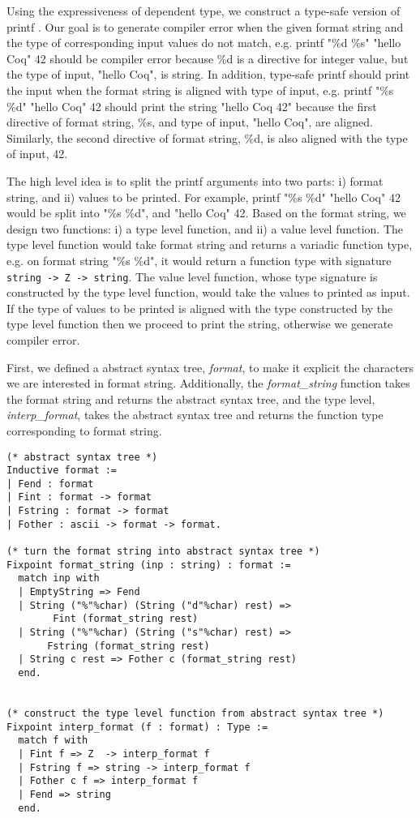  
 Using the expressiveness of dependent type, we construct a type-safe version of 
 printf \citep{Pierce:2004:ATT:107626}. Our goal is to generate compiler error when the given format string and the type of 
 corresponding input values  
 do not match, e.g. printf "\%d \%s" "hello Coq" 42 should be compiler error because
 \%d is a directive for integer value, but the type of input, "hello Coq", is string. In addition, 
 type-safe printf should print the input when the format string is aligned with type of input, e.g.
 printf "\%s \%d" "hello Coq" 42 should print the string "hello Coq  42" because the first directive 
 of format string, \%s, and type of input, "hello Coq", are aligned. Similarly, the second directive 
 of format string, \%d, is also aligned with the type of input, 42.
 
 The high level idea is to split the printf arguments into two parts: i) format string, 
 and ii) values to be printed. For example, printf "\%s \%d" "hello Coq" 42 would be split into "\%s \%d", and 
 "hello Coq" 42.  Based on the format string, we design two functions: i) a type level function, 
 and ii) a value level function. The type level function would 
 take format string and returns a variadic function type, e.g. 
 on format string "\%s \%d", it would return a function type with 
 signature \texttt{string -> Z  -> string}.
 The value level function, whose type signature 
 is constructed by the type level function, would take the values to printed as input. If the 
 type of values to be printed is aligned with the type constructed by the type level function then 
 we proceed to print the string, otherwise we generate compiler error.  
 


First, we defined a abstract syntax tree, \textit{format}, to make it explicit the characters we 
are interested in format string. Additionally, the \textit{format\_string} function takes the format string 
and returns the abstract syntax tree, and the type level, \textit{interp\_format}, takes the 
abstract syntax tree and returns the function type corresponding to format string.

\begin{verbatim}
(* abstract syntax tree *)
Inductive format :=
| Fend : format
| Fint : format -> format
| Fstring : format -> format
| Fother : ascii -> format -> format.

(* turn the format string into abstract syntax tree *)
Fixpoint format_string (inp : string) : format :=
  match inp with
  | EmptyString => Fend
  | String ("%"%char) (String ("d"%char) rest) => 
        Fint (format_string rest)
  | String ("%"%char) (String ("s"%char) rest) => 
       Fstring (format_string rest)
  | String c rest => Fother c (format_string rest)
  end.


(* construct the type level function from abstract syntax tree *)
Fixpoint interp_format (f : format) : Type :=
  match f with
  | Fint f => Z  -> interp_format f
  | Fstring f => string -> interp_format f
  | Fother c f => interp_format f
  | Fend => string
  end.
\end{verbatim}


